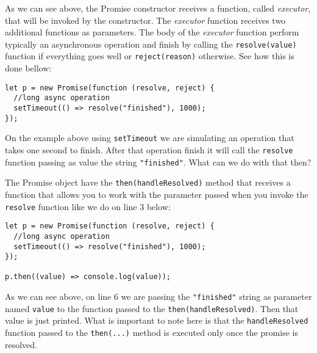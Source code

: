 \documentclass[a4paper, oneside, titlepage, 12pt]{book}
\begin{document}
As we can see above, the Promise constructor receives a function, called \textit{executor}, that will be invoked by the constructor. The \textit{executor} function receives two additional functions as parameters. The body of the \textit{executor} function perform typically an asynchronous operation and finish by calling the \texttt{resolve(value)} function if everything goes well or \texttt{reject(reason)} otherwise. See how this is done bellow:

\begin{verbatim}
let p = new Promise(function (resolve, reject) {
  //long async operation
  setTimeout(() => resolve("finished"), 1000);
});
\end{verbatim}

On the example above using \texttt{setTimeout} we are simulating an operation that takes one second to finish. After that operation finish it will call the \texttt{resolve} function passing as value the string \texttt{"finished"}. What can we do with that then?
\newline

The Promise object have the \texttt{then(handleResolved)} method that receives a function that allows you to work with the parameter passed when you invoke the \texttt{resolve} function like we do on line 3 below:   

\begin{verbatim}
let p = new Promise(function (resolve, reject) {
  //long async operation
  setTimeout(() => resolve("finished"), 1000);
});

p.then((value) => console.log(value));
\end{verbatim}

As we can see above, on line 6 we are passing the \texttt{"finished"} string as parameter named \texttt{value} to the function passed to the \texttt{then(handleResolved)}. Then that value is just printed. What is important to note here is that the \texttt{handleResolved} function passed to the \texttt{then(...)} method is executed only once the promise is resolved.
\newline
\end{document}
